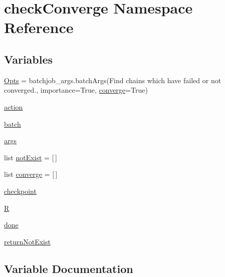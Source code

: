 \hypertarget{namespacecheckConverge}{}\section{check\+Converge Namespace Reference}
\label{namespacecheckConverge}
\subsection*{Variables}
\begin{DoxyCompactItemize}
\item 
\mbox{\hyperlink{namespacecheckConverge_aa94deb09e6fd3460721b3c2cb5a99287}{Opts}} = batchjob\+\_\+args.\+batch\+Args(\textquotesingle{}Find chains which have failed or not converged.\textquotesingle{}, importance=True, \mbox{\hyperlink{namespacecheckConverge_a5fb200481496cbc924eb129ed4f7f814}{converge}}=True)
\item 
\mbox{\hyperlink{namespacecheckConverge_ae37477410b1c1f06678de4f024218d98}{action}}
\item 
\mbox{\hyperlink{namespacecheckConverge_a699b87a16bb5743a6cf7122ae12eacaa}{batch}}
\item 
\mbox{\hyperlink{namespacecheckConverge_a2b5c0e0522fdb02b906125452390f66d}{args}}
\item 
list \mbox{\hyperlink{namespacecheckConverge_a297e5ee25578514421882e67b3e57b47}{not\+Exist}} = \mbox{[}$\,$\mbox{]}
\item 
list \mbox{\hyperlink{namespacecheckConverge_a5fb200481496cbc924eb129ed4f7f814}{converge}} = \mbox{[}$\,$\mbox{]}
\item 
\mbox{\hyperlink{namespacecheckConverge_a0f112ffac80b9bc98cd16e8bf3093a3f}{checkpoint}}
\item 
\mbox{\hyperlink{namespacecheckConverge_af6d5e1ed64937827af41b8508bcfc96b}{R}}
\item 
\mbox{\hyperlink{namespacecheckConverge_a4f619a0e9ec99cea48e822b87df58584}{done}}
\item 
\mbox{\hyperlink{namespacecheckConverge_adc718ba4b265fa9a7142d2e3466c8242}{return\+Not\+Exist}}
\end{DoxyCompactItemize}


\subsection{Variable Documentation}
\mbox{\label{namespacecheckConverge_ae37477410b1c1f06678de4f024218d98}} 
